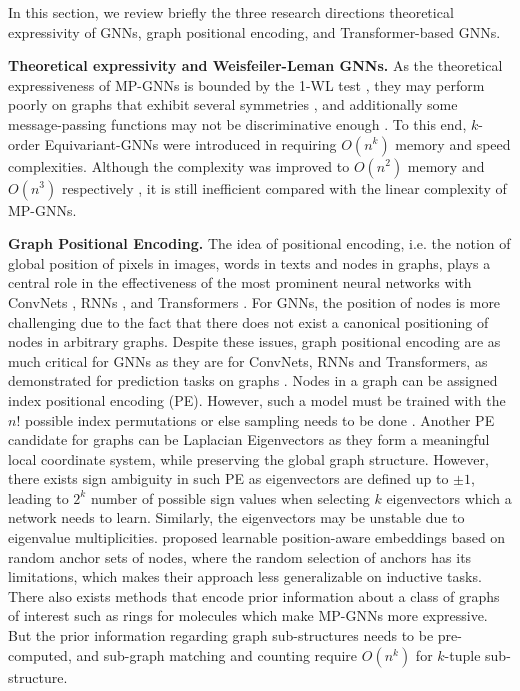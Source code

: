 \documentclass{article} \usepackage{iclr2021_conference,times}
\begin{document}
In this section, we review briefly the three research directions theoretical expressivity of GNNs, graph positional encoding, and Transformer-based GNNs.



\textbf{Theoretical expressivity and Weisfeiler-Leman GNNs.}
As the theoretical expressiveness of MP-GNNs is bounded by the 1-WL test \citep{xu2018how, morris2019weisfeiler}, they may perform poorly on graphs that exhibit several symmetries \citep{murphy2019relational}, and additionally some message-passing functions may not be discriminative enough \citep{corso2020principal}. To this end, $k$-order Equivariant-GNNs were introduced in \cite{maron2018invariant} requiring $O(n^k)$ memory and speed complexities. Although the complexity was improved to $O(n^2)$ memory and $O(n^3)$ respectively \citep{maron2019provably,chen2019equivalence,azizian2020expressive}, it is still inefficient compared with the linear complexity of MP-GNNs.




{\bf Graph Positional Encoding.}
The idea of positional encoding, i.e. the notion of global position of pixels in images, words in texts and nodes in graphs, plays a central role in the effectiveness of the most prominent neural networks with ConvNets \citep{lecun1998gradient}, RNNs \citep{hochreiter1997long}, and Transformers \citep{vaswani2017attention}. For GNNs, the position of nodes is more challenging due to the fact that there does not exist a canonical positioning of nodes in arbitrary graphs. Despite these issues, graph positional encoding are as much critical for GNNs as they are for ConvNets, RNNs and Transformers, as demonstrated for prediction tasks on graphs \citep{srinivasan2019equivalence, cui2021positional}. 
Nodes in a graph can be assigned index positional encoding (PE). However, such a model must be trained with the $n!$ possible index permutations or else sampling needs to be done \citep{murphy2019relational}. Another PE candidate for graphs can be Laplacian Eigenvectors \citep{dwivedi2020benchmarking, dwivedi2021generalization} as they form a meaningful local coordinate system, while preserving the global graph structure. However, there exists sign ambiguity in such PE as eigenvectors are defined up to $\pm1$, leading to $2^k$ number of possible sign values when selecting $k$ eigenvectors which a network needs to learn. Similarly, the eigenvectors may be unstable due to eigenvalue multiplicities. \cite{you2019position} proposed learnable position-aware embeddings based on random anchor sets of nodes, where the random selection of anchors has its limitations, which makes their approach less generalizable on inductive tasks. There also exists methods that encode prior information about a class of graphs of interest such as rings for molecules \citep{bouritsas2020improving, bodnar2021weisfeiler} which make MP-GNNs more expressive. But the prior information regarding graph sub-structures needs to be pre-computed, and sub-graph matching and counting require $O(n^k)$ for $k$-tuple sub-structure.
\end{document}
